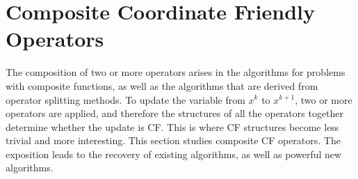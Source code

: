 \section{Composite Coordinate Friendly Operators}\label{sec:comp-cuf}
The composition of two or more operators arises in the algorithms for problems with composite functions, as well as the algorithms that are derived from operator splitting methods. To update the variable from $x^k$ to $x^{k+1}$, two or more operators are applied, and therefore the structures of all the operators together determine whether the update is CF. This is where CF structures become less trivial and more interesting. This section studies composite CF operators. The exposition leads to the recovery of existing algorithms, as well as powerful new algorithms.

